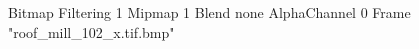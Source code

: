 {Bitmap
	{Filtering 1}
	{Mipmap 1}
	{Blend none}
	{AlphaChannel 0}
	{Frame "roof_mill_102_x.tif.bmp"}
}
